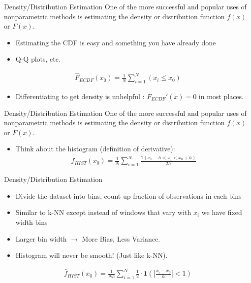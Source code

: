 \documentclass[11pt,handout,xcolor=pdftex,dvipsnames,table,mathserif,aspectratio=169]{beamer}
\begin{document}
\begin{frame}{Density/Distribution Estimation}
One of the more successful and popular uses of nonparametric methods is estimating the density or distribution function $f(x)$ or $F(x)$.
\begin{itemize}
\item Estimating the CDF is easy and something you have already done
\item Q-Q plots, etc.
\end{itemize}
\begin{eqnarray*}
\hat{F}_{ECDF}(x_0) = \frac{1}{N} \sum_{i=1}^N (x_i \leq x_0 )
\end{eqnarray*}
\begin{itemize}
\item Differentiating to get density is unhelpful : $F_{ECDF}'(x) = 0$ in most places.
\end{itemize}
\end{frame}

\begin{frame}{Density/Distribution Estimation}
One of the more successful and popular uses of nonparametric methods is estimating the density or distribution function $f(x)$ or $F(x)$.
\begin{itemize}
\item Think about the histogram (definition of derivative):
\begin{eqnarray*}
\hat{f}_{HIST}(x_0) = \frac{1}{N} \sum_{i=1}^N \frac{\mathbf{1}(x_0 - h < x_i < x_0 + h)}{2 h}
\end{eqnarray*}
\end{itemize}
\end{frame}

\begin{frame}{Density/Distribution Estimation}
\begin{itemize}
\item Divide the dataset into bins, count up fraction of observations in each bins
\item Similar to k-NN except instead of windows that vary with $x_i$ we have fixed width bins
\item Larger bin width $\rightarrow$ More Bias, Less Variance.
\item Histogram will never be smooth! (Just like k-NN).
\end{itemize}
\begin{eqnarray*}
\hat{f}_{HIST}(x_0) = \frac{1}{Nh} \sum_{i=1}^N  \frac{1}{2} \cdot \mathbf{1} \left (\left|\frac{x_i - x_0}{h} \right| < 1 \right)
\end{eqnarray*}
\end{frame}
\end{document}
